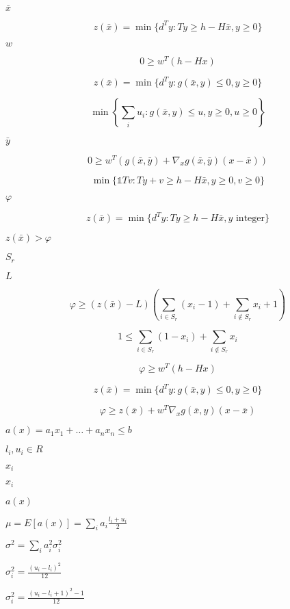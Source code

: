 \documentclass{article}
\begin{document}
$\bar{x}$
\pagebreak

\[
z(\bar{x}) = \min\{d^{T}y : Ty \geq h - H\bar{x}, y \geq 0\}
\]
\pagebreak

$w$
\pagebreak

\[
0 \geq w^{T}(h - Hx)
\]
\pagebreak

\[
z(\bar{x}) = \min\{d^{T}y : g(\bar{x}, y) \leq 0, y \geq 0\}
\]
\pagebreak

\[
  \min\left\{\sum_i u_i : g(\bar{x}, y) \leq u, y \geq 0, u \geq 0\right\}
\]
\pagebreak

$\bar{y}$
\pagebreak

\[
0 \geq w^{T}\left(g(\bar{x},\bar{y}) + \nabla_x g(\bar{x},\bar{y}) (x - \bar{x})\right)
\]
\pagebreak

\[
\min\{\mathbb{1}{T}v : Ty + v \geq h - H\bar{x}, y \geq 0, v \geq 0\}
\]
\pagebreak

$\varphi$
\pagebreak

\[
z(\bar{x}) = \min\{d^{T}y : Ty \geq h - H\bar{x}, y \mbox{ integer}\}
\]
\pagebreak

$z(\bar{x}) > \varphi$
\pagebreak

$S_{r}$
\pagebreak

$L$
\pagebreak

\[
\varphi \geq (z(\bar{x}) - L)(\sum_{i \in S_{r}}(x_{i} - 1) + \sum_{i \notin S_{r}}x_{i} + 1)
\]
\pagebreak

\[
1 \leq \sum_{i \in S_{r}}(1 - x_{i}) + \sum_{i \notin S_{r}}x_{i}
\]
\pagebreak

\[
\varphi \geq w^{T}(h - Hx)
\]
\pagebreak

\[
z(\bar{x}) = \min\{d^{T}y : g(\bar{x},y) \leq 0, y \geq 0\}
\]
\pagebreak

\[
\varphi \geq z(\bar{x}) + w^{T} \nabla_x g(\bar{x}, y) (x-\bar{x})
\]
\pagebreak

$ a(x) = a_1 x_1 + \dots + a_n x_n \leq b $
\pagebreak

$ l_i, u_i \in R$
\pagebreak

$x_i$
\pagebreak

$x_i $
\pagebreak

$a(x)$
\pagebreak

$ \mu = E[a(x)] = \sum_i a_i\frac{l_i + u_i}{2}$
\pagebreak

$ \sigma^2 = \sum_i a_i^2 \sigma_i^2 $
\pagebreak

$ \sigma_i^2 = \frac{(u_i - l_i)^2}{12}$
\pagebreak

$ \sigma_i^2 = \frac{(u_i - l_i + 1)^2 - 1}{12}$
\pagebreak
\end{document}

